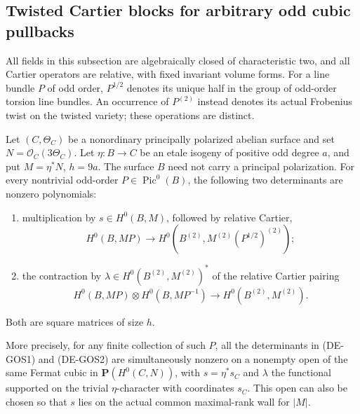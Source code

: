 \subsection{Twisted Cartier blocks for arbitrary odd cubic pullbacks}

All fields in this subsection are algebraically closed of characteristic
two, and all Cartier operators are relative, with fixed invariant volume
forms. For a line bundle \(P\) of odd order, \(P^{1/2}\) denotes its
unique half in the group of odd-order torsion line bundles. An occurrence
of \(P^{(2)}\) instead denotes its actual Frobenius twist on the twisted
variety; these operations are distinct.

\begin{lemma}
\label{lem:DE-general-odd-source-twisted-blocks}
Let \((C,\Theta_C)\) be a nonordinary principally polarized abelian
surface and set \(N=\mathcal O_C(3\Theta_C)\). Let
\(\eta:B\to C\) be an etale isogeny of positive odd degree \(a\),
and put \(M=\eta^*N\), \(h=9a\). The surface \(B\) need not
carry a principal polarization. For every nontrivial odd-order
\(P\in\operatorname{Pic}^0(B)\),
the following two determinants are nonzero polynomials:
\begin{enumerate}
\item multiplication by \(s\in H^0(B,M)\), followed by relative
Cartier,
\[
 H^0(B,MP)\longrightarrow
 H^0(B^{(2)},M^{(2)}(P^{1/2})^{(2)});
 \tag{DE-GOS1}
\]
\item the contraction by \(\lambda\in H^0(B^{(2)},M^{(2)})^*\)
of the relative Cartier pairing
\[
 H^0(B,MP)\otimes H^0(B,MP^{-1})
                 \longrightarrow H^0(B^{(2)},M^{(2)}).
 \tag{DE-GOS2}
\]
\end{enumerate}
Both are square matrices of size \(h\).

More precisely, for any finite collection of such \(P\), all the
determinants in
(DE-GOS1) and (DE-GOS2) are simultaneously nonzero on a nonempty
open of the same Fermat cubic in \(\mathbf P(H^0(C,N))\), with
\(s=\eta^*s_C\) and \(\lambda\) the functional supported on the
trivial \(\eta\)-character with coordinates \(s_C\).
This open can also be chosen so that \(s\) lies on the actual common
maximal-rank wall for \(|M|\).
\end{lemma}
